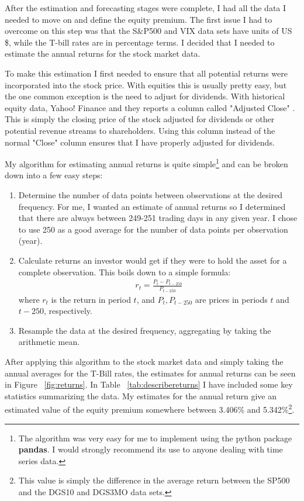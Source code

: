 \documentclass[a4paper, 11pt, twoside]{article}
\theoremstyle{definition} %
\numberwithin{equation}{section}
\begin{document}
  After the estimation and forecasting stages were complete, I had all the data I needed to move on and define the equity premium. The first issue I had to overcome on this step was that the S\&P500 and VIX data sets have units of US \$, while the T-bill rates are in percentage terms. I decided that I needed to estimate the annual returns for the stock market data.

  To make this estimation I first needed to ensure that all potential returns were incorporated into the stock price. With equities this is usually pretty easy, but the one common exception is the need to adjust for dividends. With historical equity data, Yahoo! Finance and they reports a column called "Adjusted Close" . This is simply the closing price of the stock adjusted for dividends or other potential revenue streams to shareholders. Using this column instead of the normal "Close" column ensures that I have properly adjusted for dividends.

  My algorithm for estimating annual returns is quite simple\footnote{The algorithm was very easy for me to implement using the python package \textbf{pandas}. I would strongly recommend its use to anyone dealing with time series data.} and can be broken down into a few easy steps:

  \begin{enumerate}
    \item Determine the number of data points between observations at the desired frequency. For me, I wanted an estimate of annual returns so I determined that there are always between 249-251 trading days in any given year. I chose to use 250  as a good average for the number of data points per observation (year).
    \item Calculate returns an investor would get if they were to hold the asset for a complete observation. This boils down to a simple formula:
    \begin{align}
      r_t = \frac{P_t - P_{t - 250}}{P_{t - 250}}
    \end{align}
    where $r_t$ is the return in period $t$, and $P_t, P_{t - 250}$ are prices in periods $t$ and $t - 250$, respectively.
    \item Resample the data at the desired frequency, aggregating by taking the arithmetic mean.
  \end{enumerate}

  After applying this algorithm to the stock market data and simply taking the annual averages for the T-Bill rates, the estimates for annual returns can be seen in Figure ~\ref{fig:returns}. In Table ~\ref{tab:describereturns} I have included some key statistics summarizing the data. My estimates for the annual return give an estimated value of the equity premium somewhere between 3.406\% and 5.342\%\footnote{This value is simply the difference in the average return between the SP500 and the DGS10 and DGS3MO data sets.}.
\end{document}
